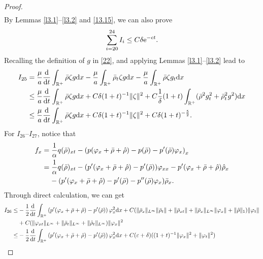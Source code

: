\documentclass[11pt]{article}
\theoremstyle{plain}
\numberwithin{equation}{section}
\begin{document}
\begin{proof}
\begin{align}
		\end{align}
		By Lemmas \ref{l3.1}--\ref{l3.2} and \eqref{13.15}, we can also prove
		\begin{align}
			\sum_{i=20}^{24}I_i\leq C\delta{\rm e}^{-ct}.
		\end{align}
		Recalling
		the definition of $g$ in \eqref{22}, and applying Lemmas \ref{l3.1}--\ref{l3.2} lead to
		\begin{align}\label{K15}
			I_{25}
			&=\frac{\mu}{a}\frac{{\rm d}}{{\rm d}t}\int_{\mathbb{R}^+}\bar\rho\zeta g{\rm d}x-\frac{\mu}{a}\int_{\mathbb{R}^+}\bar\rho_t\zeta g{\rm d}x-\frac{\mu}{a}\int_{\mathbb{R}^+}\bar\rho\zeta g_t{\rm d}x\notag\\
			&\leq \frac{\mu}{a}\frac{{\rm d}}{{\rm d}t}\int_{\mathbb{R}^+}\bar\rho\zeta g{\rm d}x+C\delta(1+t)^{-1}\|\zeta\|^2
			+C\frac{1}{\delta}(1+t)\int_{\mathbb{R}^+}(\bar\rho^2g_t^2+\bar\rho_t^2g^2){\rm d}x\notag\\
			&\leq \frac{\mu}{a}\frac{{\rm d}}{{\rm d}t}\int_{\mathbb{R}^+}\bar\rho\zeta g{\rm d}x+C\delta(1+t)^{-1}\|\zeta\|^2+C\delta(1+t)^{-\frac{5}{2}}.
		\end{align}
	For $I_{26}$--$I_{27}$, notice that
		\begin{align}\label{fx}
			f_x&=\frac{1}{\alpha}q(\bar\rho)_{xt}-\left(p(\varphi_x+\bar\rho+\hat\rho)-p(\bar\rho)-p^{\prime}(\bar\rho)\varphi_x\right)_x\notag\\
			&=\frac{1}{\alpha}q(\bar\rho)_{xt}-(p^{\prime}(\varphi_x+\bar\rho+\hat\rho)-p^{\prime}(\bar\rho))\varphi_{xx}-p^{\prime}(\varphi_x+\bar\rho+\hat\rho)\hat\rho_x\notag\\
			&\;\;\;\;-(p^{\prime}(\varphi_x+\bar\rho+\hat\rho)-p^{\prime}(\bar\rho)-p^{\prime\prime}(\bar\rho)\varphi_x)\bar\rho_x.
		\end{align}
	Through direct calculation, we can get
		\begin{align}\label{J16}
			I_{26}\leq& -\frac{1}{2}	\frac{{\rm d}}{{\rm d}t}\int_{\mathbb{R}^+}\left(p^{\prime}(\varphi_x+\bar\rho+\hat\rho)-p^{\prime}(\bar\rho)\right)\varphi_x^2{\rm d}x+C(\|\bar\rho_x\|_{L^\infty}\|\bar\rho_t\|+\|\bar\rho_{xt}\|+\|\bar\rho_x\|_{L^\infty}\|\varphi_x\|+\|\hat\rho\|_1)\|\varphi_t\|\notag\\
			&+C(\|\varphi_{xt}\|_{L^\infty}+\|\bar\rho_t\|_{L^\infty}+\|\hat\rho_t\|_{L^\infty})\|\varphi_x\|^2\notag\\ 
			\leq&-\frac{1}{2}	\frac{{\rm d}}{{\rm d}t}\int_{\mathbb{R}^+}\left(p^{\prime}(\varphi_x+\bar\rho+\hat\rho)-p^{\prime}(\bar\rho)\right)\varphi_x^2{\rm d}x+C(\varepsilon+\delta)((1+t)^{-1}\|\varphi_x\|^2+\|\varphi_t\|^2)\notag\\ 

\end{align}
\end{proof}
\end{document}
